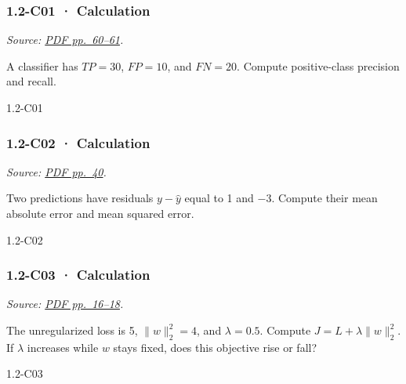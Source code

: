 \noindent\begin{minipage}{\linewidth}

\subsubsection{1.2-C01 · Calculation}\label{c01-calculation-1}

\emph{Source:
\href{../Lecture\%20Slides/1.2.\%20Shallow\%20Learning.pdf\#page=60}{PDF
pp.~60--61}.}

A classifier has \(TP=30\), \(FP=10\), and \(FN=20\). Compute
positive-class precision and recall.

\begin{solution}[26mm]{1.2-C01}

\end{solution}
\end{minipage}\par\medskip

\noindent\begin{minipage}{\linewidth}

\subsubsection{1.2-C02 · Calculation}\label{c02-calculation-1}

\emph{Source:
\href{../Lecture\%20Slides/1.2.\%20Shallow\%20Learning.pdf\#page=40}{PDF
pp.~40}.}

Two predictions have residuals \(y-\hat y\) equal to 1 and \(-3\).
Compute their mean absolute error and mean squared error.

\begin{solution}[26mm]{1.2-C02}

\end{solution}
\end{minipage}\par\medskip

\noindent\begin{minipage}{\linewidth}

\subsubsection{1.2-C03 · Calculation}\label{c03-calculation-1}

\emph{Source:
\href{../Lecture\%20Slides/1.2.\%20Shallow\%20Learning.pdf\#page=16}{PDF
pp.~16--18}.}

The unregularized loss is 5, \(\|w\|_2^2=4\), and \(\lambda=0.5\).
Compute \(J=L+\lambda\|w\|_2^2\). If \(\lambda\) increases while \(w\)
stays fixed, does this objective rise or fall?

\begin{solution}[26mm]{1.2-C03}

\end{solution}
\end{minipage}\par\medskip

